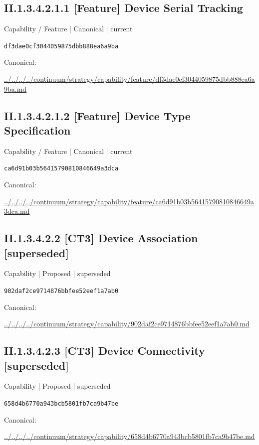 \documentclass[10pt,a4paper]{article}
\begin{document}
\subsection*{II.1.3.4.2.1.1 [Feature] Device Serial Tracking}
\label{element-df3dae0cf3044059875dbb888ea6a9ba}
{\small Capability / Feature | Canonical | current}\par
\texttt{df3dae0cf3044059875dbb888ea6a9ba}\par
Canonical: \par
{\footnotesize\url{../../../../continuum/strategy/capability/feature/df3dae0cf3044059875dbb888ea6a9ba.md}}\par
\subsection*{II.1.3.4.2.1.2 [Feature] Device Type Specification}
\label{element-ca6d91b03b56415790810846649a3dca}
{\small Capability / Feature | Canonical | current}\par
\texttt{ca6d91b03b56415790810846649a3dca}\par
Canonical: \par
{\footnotesize\url{../../../../continuum/strategy/capability/feature/ca6d91b03b56415790810846649a3dca.md}}\par
\subsection*{II.1.3.4.2.2 [CT3] Device Association [superseded]}
\label{element-902daf2ce9714876bbfee52eef1a7ab0}
{\small Capability | Proposed | superseded}\par
\texttt{902daf2ce9714876bbfee52eef1a7ab0}\par
Canonical: \par
{\footnotesize\url{../../../../continuum/strategy/capability/902daf2ce9714876bbfee52eef1a7ab0.md}}\par
\subsection*{II.1.3.4.2.3 [CT3] Device Connectivity [superseded]}
\label{element-658d4b6770a943bcb5801fb7ca9b47be}
{\small Capability | Proposed | superseded}\par
\texttt{658d4b6770a943bcb5801fb7ca9b47be}\par
Canonical: \par
{\footnotesize\url{../../../../continuum/strategy/capability/658d4b6770a943bcb5801fb7ca9b47be.md}}\par
\end{document}
